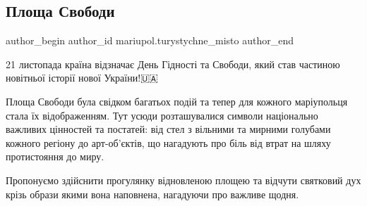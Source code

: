  
 
 
 
 

\subsection{Площа Свободи}
\label{sec:21_11_2021.fb.mariupol.turystychne_misto.1.ploscha_svobody}

\ifcmt
 author_begin
   author_id mariupol.turystychne_misto
 author_end
\fi

21 листопада країна відзначає День Гідності та Свободи, який став частиною
новітньої історії нової України!🇺🇦

Площа Свободи була свідком багатьох подій та тепер для кожного маріупольця
стала їх відображенням. Тут усюди розташувалися символи національно важливих
цінностей та постатей: від стел з вільними та мирними голубами кожного регіону
до арт-об'єктів, що нагадують про біль від втрат на шляху протистояння до миру.

Пропонуємо здійснити прогулянку відновленою площею та відчути святковий дух
крізь образи якими вона наповнена, нагадуючи про важливе щодня.
